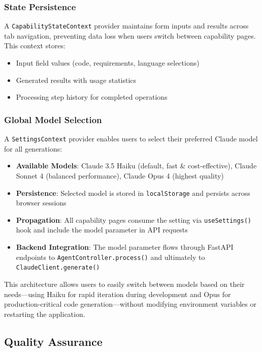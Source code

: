 \documentclass[12pt,a4paper]{article}
\begin{document}
\subsubsection{State Persistence}

A \texttt{CapabilityStateContext} provider maintains form inputs and results across tab navigation, preventing data loss when users switch between capability pages. This context stores:
\begin{itemize}
    \item Input field values (code, requirements, language selections)
    \item Generated results with usage statistics
    \item Processing step history for completed operations
\end{itemize}

\subsubsection{Global Model Selection}

A \texttt{SettingsContext} provider enables users to select their preferred Claude model for all generations:
\begin{itemize}
    \item \textbf{Available Models}: Claude 3.5 Haiku (default, fast \& cost-effective), Claude Sonnet 4 (balanced performance), Claude Opus 4 (highest quality)
    \item \textbf{Persistence}: Selected model is stored in \texttt{localStorage} and persists across browser sessions
    \item \textbf{Propagation}: All capability pages consume the setting via \texttt{useSettings()} hook and include the model parameter in API requests
    \item \textbf{Backend Integration}: The model parameter flows through FastAPI endpoints to \texttt{AgentController.process()} and ultimately to \texttt{ClaudeClient.generate()}
\end{itemize}

This architecture allows users to easily switch between models based on their needs---using Haiku for rapid iteration during development and Opus for production-critical code generation---without modifying environment variables or restarting the application.

\subsection{Quality Assurance}
\end{document}
